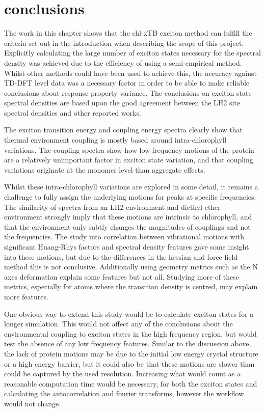 \section{conclusions}
\label{sec:specdens_concs}

The work in this chapter shows that the chl-xTB exciton method can fulfill the criteria
set out in the introduction when describing the scope of this project. Explicitly 
calculating the large number of exciton states necessary for the spectral density 
was achieved  due to the efficiency of using a semi-empirical method. Whilst other 
methods could have been used to achieve this, the accuracy against TD-DFT level 
data was a necessary factor in order to be able to make reliable conclusions about 
response property variance. The conclusions on exciton state spectral densities 
are based upon the good agreement between the LH2 site spectral densities and other 
reported works.

The exciton transition energy and coupling energy spectra clearly show that thermal
environment coupling is mostly based around intra-chlorophyll variations. The coupling
spectra show how low-frequency motions of the protein are a relatively unimportant 
factor in exciton state variation, and that coupling variations originate at the
monomer level than aggregate effects.

Whilst these intra-chlorophyll variations are explored in some detail, it remains
a challenge to fully assign the underlying motions for peaks at specific frequencies.
The similarity of spectra from an LH2 environment and diethyl-ether environment 
strongly imply that these motions are intrinsic to chlorophyll, and that the environment
only subtly changes the magnitudes of couplings and not the frequencies. The study
into correlation between vibrational motions with significant Huang-Rhys factors 
and spectral density features gave some insight into these motions, but due to the
differences in the hessian and force-field method this is not conclusive. Additionally 
using geometry metrics such as the N axes deformation explain some features but not
all. Studying more of these metrics, especially for atoms where the transition density
is centred, may explain more features.

One obvious way to extend this study would be to calculate exciton states for a 
longer simulation. This would not affect any of the conclusions about the environmental
coupling to exciton states in the high frequency region, but would test the absence
of any low frequency features. Similar to the discussion above, the lack of protein 
motions may be due to the initial low energy crystal structure or a high energy 
barrier, but it could also be that these motions are slower than could be captured 
by the used resolution. Increasing what would count as a reasonable computation 
time would be necessary, for both the exciton states and calculating the autocorrelation 
and fourier transforms, however the workflow would not change.

